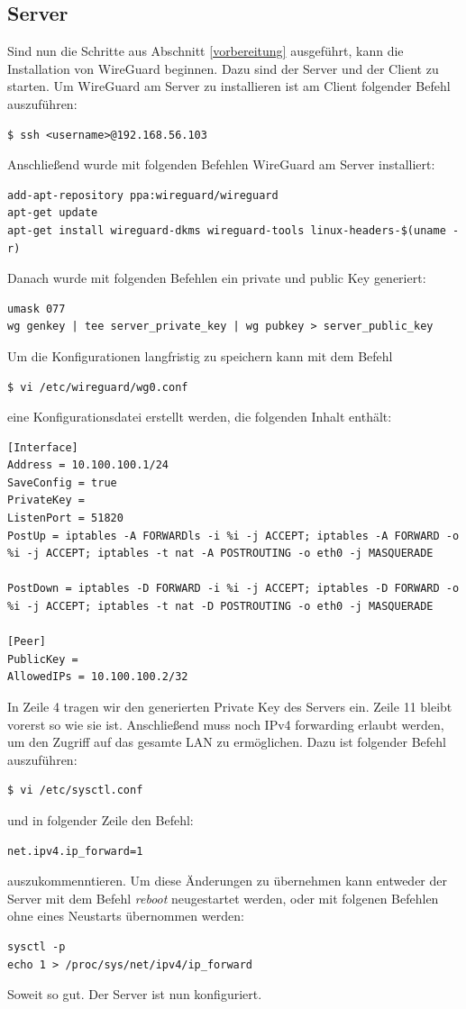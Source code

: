 \subsection{Server}
Sind nun die Schritte aus Abschnitt \ref{vorbereitung} ausgeführt, kann die Installation von WireGuard beginnen. Dazu sind der Server und der Client zu starten. Um WireGuard am Server zu installieren ist am Client folgender Befehl auszuführen:
\begin{lstlisting}
$ ssh <username>@192.168.56.103
\end{lstlisting}
Anschließend wurde mit folgenden Befehlen WireGuard am Server installiert:
\begin{lstlisting}
add-apt-repository ppa:wireguard/wireguard
apt-get update
apt-get install wireguard-dkms wireguard-tools linux-headers-$(uname -r)
\end{lstlisting}
Danach wurde mit folgenden Befehlen ein private und public Key generiert:
\begin{lstlisting}
umask 077
wg genkey | tee server_private_key | wg pubkey > server_public_key
\end{lstlisting}
\newpage \noindent
Um die Konfigurationen langfristig zu speichern kann mit dem Befehl
\begin{lstlisting}
$ vi /etc/wireguard/wg0.conf
\end{lstlisting}
eine Konfigurationsdatei erstellt werden, die folgenden Inhalt enthält:
\begin{lstlisting}
[Interface]
Address = 10.100.100.1/24
SaveConfig = true
PrivateKey = 
ListenPort = 51820
PostUp = iptables -A FORWARDls -i %i -j ACCEPT; iptables -A FORWARD -o %i -j ACCEPT; iptables -t nat -A POSTROUTING -o eth0 -j MASQUERADE

PostDown = iptables -D FORWARD -i %i -j ACCEPT; iptables -D FORWARD -o %i -j ACCEPT; iptables -t nat -D POSTROUTING -o eth0 -j MASQUERADE

[Peer]
PublicKey = 
AllowedIPs = 10.100.100.2/32
\end{lstlisting}
In Zeile 4 tragen wir den generierten Private Key des Servers ein. Zeile 11 bleibt vorerst so wie sie ist. \newline\newline
Anschließend muss noch IPv4 forwarding erlaubt werden, um den Zugriff auf das gesamte LAN zu ermöglichen.
Dazu ist folgender Befehl auszuführen:
\begin{lstlisting}
$ vi /etc/sysctl.conf
\end{lstlisting}
und in folgender Zeile den Befehl:
\begin{lstlisting}
net.ipv4.ip_forward=1
\end{lstlisting}
auszukommenntieren. \newline\newline
Um diese Änderungen zu übernehmen kann entweder der Server mit dem Befehl \textit{reboot} neugestartet werden, oder mit folgenen Befehlen ohne eines Neustarts übernommen werden:
\begin{lstlisting}
sysctl -p
echo 1 > /proc/sys/net/ipv4/ip_forward
\end{lstlisting} \noindent
Soweit so gut. Der Server ist nun konfiguriert.
